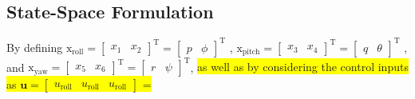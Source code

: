 \documentclass[3p]{elsarticle}
\begin{document}
\subsection{State-Space Formulation}\label{sec:state-space}
\noindent By defining $\boldsymbol{\mathrm{x}}_{\text{roll}} = \begin{bmatrix}
    x_1 & x_2
\end{bmatrix}^{\mathrm{T}}=
\begin{bmatrix}
    p & \phi
\end{bmatrix}^{\mathrm{T}}$
,
$\boldsymbol{\mathrm{x}}_{\text{pitch}} = \begin{bmatrix}
    x_3 & x_4 \end{bmatrix}^{\mathrm{T}} = 
    \begin{bmatrix}
    q & \theta \end{bmatrix}^{\mathrm{T}}
    $
    , and
    $\boldsymbol{\mathrm{x}}_{\text{yaw}} = 
    \begin{bmatrix}
        x_5 & x_6
    \end{bmatrix}^{\mathrm{T}} = 
    \begin{bmatrix}
        r & \psi
    \end{bmatrix}^{\mathrm{T}}$, \colorbox{yellow}{as well as by considering the control inputs as 
    $\boldsymbol{u} = \begin{bmatrix}
        u_{\text{roll}} & u_{\text{roll}} & u_{\text{roll}}
    \end{bmatrix}$ =} 
    
\end{document}
